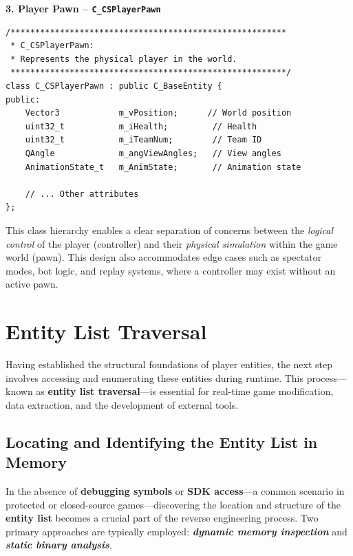 \noindent\textbf{3. Player Pawn – \texttt{C\_CSPlayerPawn}}

\begin{lstlisting}[style=cppstyle, caption={C\_CSPlayerPawn – In-World Representation of the Player}]
/********************************************************
 * C_CSPlayerPawn:
 * Represents the physical player in the world.
 ********************************************************/
class C_CSPlayerPawn : public C_BaseEntity {
public:
    Vector3            m_vPosition;      // World position
    uint32_t           m_iHealth;         // Health
    uint32_t           m_iTeamNum;        // Team ID
    QAngle             m_angViewAngles;   // View angles
    AnimationState_t   m_AnimState;       // Animation state

    // ... Other attributes
};
\end{lstlisting}


This class hierarchy enables a clear separation of concerns between the \textit{logical control} of the player (controller) and their \textit{physical simulation} within the game world (pawn). This design also accommodates edge cases such as spectator modes, bot logic, and replay systems, where a controller may exist without an active pawn.

\section{Entity List Traversal}

Having established the structural foundations of player entities, the next step involves accessing and enumerating these entities during runtime. This process—known as \textbf{entity list traversal}—is essential for real-time game modification, data extraction, and the development of external tools.

\subsection{Locating and Identifying the Entity List in Memory}

In the absence of \textbf{debugging symbols} or \textbf{SDK access}—a common scenario in protected or closed-source games—discovering the location and structure of the \textbf{entity list} becomes a crucial part of the reverse engineering process. Two primary approaches are typically employed: \textit{\textbf{dynamic memory inspection}} and \textit{\textbf{static binary analysis}}.

